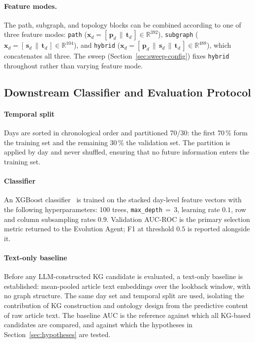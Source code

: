 \paragraph{Feature modes.}
The path, subgraph, and topology blocks can be combined according to one of three feature modes:
\texttt{path} ($\mathbf{x}_d = [\,\mathbf{p}_d \,\|\, \mathbf{t}_d\,] \in \mathbb{R}^{392}$),
\texttt{subgraph} ($\mathbf{x}_d = [\,\mathbf{s}_d \,\|\, \mathbf{t}_d\,] \in \mathbb{R}^{104}$), and
\texttt{hybrid} ($\mathbf{x}_d = [\,\mathbf{p}_d \,\|\, \mathbf{s}_d \,\|\, \mathbf{t}_d\,] \in
\mathbb{R}^{488}$), which concatenates all three.
The sweep (Section~\ref{sec:sweep-config}) fixes \texttt{hybrid} throughout rather than varying
feature mode.

\subsection{Downstream Classifier and Evaluation Protocol}
\label{sec:eval-protocol}

\paragraph{Temporal split}
Days are sorted in chronological order and partitioned 70/30: the first 70\,\% form the training
set and the remaining 30\,\% the validation set.
The partition is applied by day and never shuffled, ensuring that no future information enters the
training set.

\paragraph{Classifier}
An XGBoost classifier~\citep{chen2016xgboost} is trained on the stacked day-level feature vectors
with the following hyperparameters: 100 trees, \texttt{max\_depth}$\,=\,3$, learning rate $0.1$,
row and column subsampling rates $0.9$.
Validation AUC-ROC is the primary selection metric returned to the Evolution Agent; F1 at
threshold $0.5$ is reported alongside it.

\paragraph{Text-only baseline}
Before any LLM-constructed KG candidate is evaluated, a text-only baseline is established: mean-pooled
article text embeddings over the lookback window, with no graph structure.
The same day set and temporal split are used, isolating the contribution of KG construction and
ontology design from the predictive content of raw article text.
The baseline AUC is the reference against which all KG-based candidates are compared, and against
which the hypotheses in Section~\ref{sec:hypotheses} are tested.
